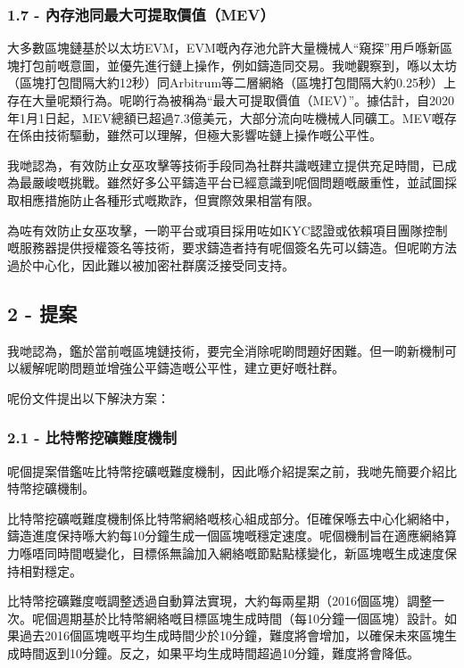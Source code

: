 \documentclass[
]{article}
\begin{document}
\subsubsection{1.7 -
內存池同最大可提取價值（MEV）}\label{ux5167ux5b58ux6c60ux540cux6700ux5927ux53efux63d0ux53d6ux50f9ux503cmev}

大多數區塊鏈基於以太坊EVM，EVM嘅內存池允許大量機械人``窺探''用戶喺新區塊打包前嘅意圖，並優先進行鏈上操作，例如鑄造同交易。我哋觀察到，喺以太坊（區塊打包間隔大約12秒）同Arbitrum等二層網絡（區塊打包間隔大約0.25秒）上存在大量呢類行為。呢啲行為被稱為``最大可提取價值（MEV）''。據估計，自2020年1月1日起，MEV總額已超過7.3億美元，大部分流向咗機械人同礦工。MEV嘅存在係由技術驅動，雖然可以理解，但極大影響咗鏈上操作嘅公平性。

我哋認為，有效防止女巫攻擊等技術手段同為社群共識嘅建立提供充足時間，已成為最嚴峻嘅挑戰。雖然好多公平鑄造平台已經意識到呢個問題嘅嚴重性，並試圖採取相應措施防止各種形式嘅欺詐，但實際效果相當有限。

為咗有效防止女巫攻擊，一啲平台或項目採用咗如KYC認證或依賴項目團隊控制嘅服務器提供授權簽名等技術，要求鑄造者持有呢個簽名先可以鑄造。但呢啲方法過於中心化，因此難以被加密社群廣泛接受同支持。

\subsection{2 - 提案}\label{ux63d0ux6848}

我哋認為，鑑於當前嘅區塊鏈技術，要完全消除呢啲問題好困難。但一啲新機制可以緩解呢啲問題並增強公平鑄造嘅公平性，建立更好嘅社群。

呢份文件提出以下解決方案：

\subsubsection{2.1 -
比特幣挖礦難度機制}\label{ux6bd4ux7279ux5e63ux6316ux7926ux96e3ux5ea6ux6a5fux5236}

呢個提案借鑑咗比特幣挖礦嘅難度機制，因此喺介紹提案之前，我哋先簡要介紹比特幣挖礦機制。

比特幣挖礦嘅難度機制係比特幣網絡嘅核心組成部分。佢確保喺去中心化網絡中，鑄造進度保持喺大約每10分鐘生成一個區塊嘅穩定速度。呢個機制旨在適應網絡算力喺唔同時間嘅變化，目標係無論加入網絡嘅節點點樣變化，新區塊嘅生成速度保持相對穩定。

比特幣挖礦難度嘅調整透過自動算法實現，大約每兩星期（2016個區塊）調整一次。呢個週期基於比特幣網絡嘅目標區塊生成時間（每10分鐘一個區塊）設計。如果過去2016個區塊嘅平均生成時間少於10分鐘，難度將會增加，以確保未來區塊生成時間返到10分鐘。反之，如果平均生成時間超過10分鐘，難度將會降低。
\end{document}
